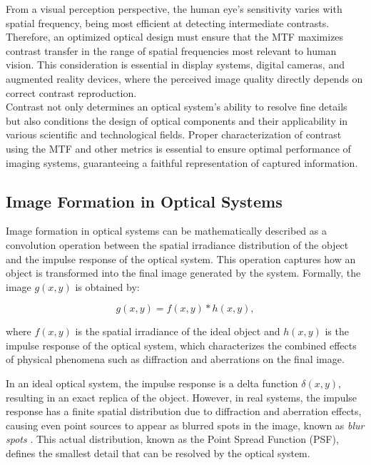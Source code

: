 From a visual perception perspective, the human eye's sensitivity varies with spatial frequency, being most efficient at detecting intermediate contrasts. Therefore, an optimized optical design must ensure that the MTF maximizes contrast transfer in the range of spatial frequencies most relevant to human vision. This consideration is essential in display systems, digital cameras, and augmented reality devices, where the perceived image quality directly depends on correct contrast reproduction.\\

Contrast not only determines an optical system’s ability to resolve fine details but also conditions the design of optical components and their applicability in various scientific and technological fields. Proper characterization of contrast using the MTF and other metrics is essential to ensure optimal performance of imaging systems, guaranteeing a faithful representation of captured information.\\


\subsection{Image Formation in Optical Systems}

Image formation in optical systems can be mathematically described as a convolution operation between the spatial irradiance distribution of the object and the impulse response of the optical system. This operation captures how an object is transformed into the final image generated by the system. Formally, the image \( g(x,y) \) is obtained by:

\begin{equation}
g(x,y) = f(x,y) * h(x,y),
\end{equation}

where \( f(x,y) \) is the spatial irradiance of the ideal object and \( h(x,y) \) is the impulse response of the optical system, which characterizes the combined effects of physical phenomena such as diffraction and aberrations on the final image.

In an ideal optical system, the impulse response is a delta function \(\delta(x,y)\), resulting in an exact replica of the object. However, in real systems, the impulse response has a finite spatial distribution due to diffraction and aberration effects, causing even point sources to appear as blurred spots in the image, known as \textit{blur spots} \cite{Boreman2001ModulationTT52}. This actual distribution, known as the Point Spread Function (PSF), defines the smallest detail that can be resolved by the optical system.

